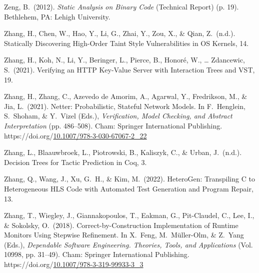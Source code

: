 \documentclass[12pt,twoside]{article}
\begin{document}
{\begin{thebibliography}{1079}
\mdbibitemlabel{}Zeng, B.~(2012). \emph{Static Analysis on Binary Code} (Technical Report) (p. 19). Bethlehem, PA: Lehigh University.%

\mdbibitemlabel{}Zhang, H., Chen, W., Hao, Y., Li, G., Zhai, Y., Zou, X., \& Qian, Z.~(n.d.). Statically Discovering High-Order Taint Style Vulnerabilities in OS Kernels, 14.%

\mdbibitemlabel{}Zhang, H., Koh, N., Li, Y., Beringer, L., Pierce, B., Honoré, W., … Zdancewic, S.~(2021). Verifying an HTTP Key-Value Server with Interaction Trees and VST, 19.%

\mdbibitemlabel{}Zhang, H., Zhang, C., Azevedo de Amorim, A., Agarwal, Y., Fredrikson, M., \& Jia, L.~(2021). Netter: Probabilistic, Stateful Network Models. In F.~Henglein, S.~Shoham, \& Y.~Vizel (Eds.), \emph{Verification, Model Checking, and Abstract Interpretation} (pp. 486–508). Cham: Springer International Publishing. https://doi.org/\href{https://dx.doi.org/10.1007/978-3-030-67067-2_22}{10.1007/978-3-030-67067-2\_22}%

\mdbibitemlabel{}Zhang, L., Blaauwbroek, L., Piotrowski, B., Kaliszyk, C., \& Urban, J.~(n.d.). Decision Trees for Tactic Prediction in Coq, 3.%

\mdbibitemlabel{}Zhang, Q., Wang, J., Xu, G.~H., \& Kim, M.~(2022). HeteroGen: Transpiling C to Heterogeneous HLS Code with Automated Test Generation and Program Repair, 13.%

\mdbibitemlabel{}Zhang, T., Wiegley, J., Giannakopoulos, T., Eakman, G., Pit-Claudel, C., Lee, I., \& Sokolsky, O.~(2018). Correct-by-Construction Implementation of Runtime Monitors Using Stepwise Refinement. In X.~Feng, M.~Müller-Olm, \& Z.~Yang (Eds.), \emph{Dependable Software Engineering. Theories, Tools, and Applications} (Vol. 10998, pp. 31–49). Cham: Springer International Publishing. https://doi.org/\href{https://dx.doi.org/10.1007/978-3-319-99933-3_3}{10.1007/978-3-319-99933-3\_3}%


\end{thebibliography}}
\end{document}
